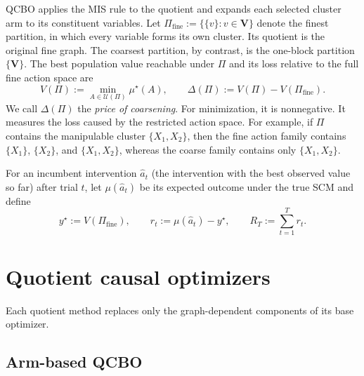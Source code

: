 \documentclass[twoside]{article}
\begin{document}
QCBO applies the MIS rule to the quotient and expands each selected cluster arm to its constituent variables.
Let $\Pi_{\mathrm{fine}} := \{\{v\}:v\in\mathbf V\}$ denote the finest partition, in which every variable forms its own cluster. Its quotient is the original fine graph. The coarsest partition, by contrast, is the one-block partition $\{\mathbf V\}$. The best population value reachable under $\Pi$ and its loss relative to the full fine action space are
\begin{equation}
  V(\Pi):=\min_{A\in\mathcal U(\Pi)}\mu^\star(A),
  \qquad
  \Delta(\Pi):=V(\Pi)-V(\Pi_{\mathrm{fine}}).
  \label{eq:price}
\end{equation}
We call $\Delta(\Pi)$ the \emph{price of coarsening}. For minimization, it is nonnegative. It measures the loss caused by the restricted action space. For example, if $\Pi$ contains the manipulable cluster $\{X_1,X_2\}$, then the fine action family contains $\{X_1\}$, $\{X_2\}$, and $\{X_1,X_2\}$, whereas the coarse family contains only $\{X_1,X_2\}$.

For an incumbent intervention $\hat a_t$ (the intervention with the best observed value so far) after trial $t$, let $\mu(\hat a_t)$ be its expected outcome under the true SCM and define
\begin{equation}
  y^\star:=V(\Pi_{\mathrm{fine}}),\qquad
  r_t:=\mu(\hat a_t)-y^\star,\qquad
  R_T:=\sum_{t=1}^{T}r_t.
  \label{eq:regret}
\end{equation}

\section{Quotient causal optimizers}
\label{sec:methods}

Each quotient method replaces only the graph-dependent components of its base optimizer.

\subsection{Arm-based QCBO}
\end{document}
